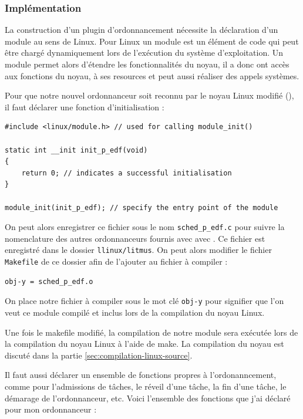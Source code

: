 \subsubsection{Implémentation}

La construction d'un plugin d'ordonnancement nécessite la déclaration d'un module au sens de Linux. Pour Linux un module est un élément de code qui peut être chargé dynamiquement lors de l’exécution du système d'exploitation. Un module permet alors d'étendre les fonctionnalités du noyau, il a donc ont accès aux fonctions du noyau, à ses resources et peut aussi réaliser des appels systèmes.

Pour que notre nouvel ordonnanceur soit reconnu par le noyau Linux modifié (\litmus), il faut déclarer une fonction d'initialisation :
\begin{lstlisting}[style=cstyle]
#include <linux/module.h> // used for calling module_init()

static int __init init_p_edf(void)
{
    return 0; // indicates a successful initialisation
}

module_init(init_p_edf); // specify the entry point of the module 
\end{lstlisting} 

On peut alors enregistrer ce fichier sous le nom \lstinline{sched_p_edf.c} pour suivre la nomenclature des autres ordonnanceurs fournis avec avec \litmus. Ce fichier est enregistré dans le dossier \lstinline{llinux/litmus}. On peut alors modifier le fichier \lstinline{Makefile} de ce dossier afin de l'ajouter au fichier à compiler :

\begin{lstlisting}[style=makefilestyle]  
    obj-y = sched_p_edf.o
\end{lstlisting}    

On place notre fichier à compiler sous le mot clé \texttt{obj-y} pour signifier que l'on veut ce module compilé et inclus lors de la compilation du noyau Linux.

Une fois le makefile modifié, la compilation de notre module sera exécutée lors de la compilation du noyau Linux à l'aide de make. La compilation du noyau est discuté dans la partie \ref{sec:compilation-linux-source}.

Il faut aussi déclarer un ensemble de fonctions propres à l'ordonanncement, comme pour l'admissions de tâches, le réveil d'une tâche, la fin d'une tâche, le démarage de l'ordonnanceur, etc. Voici l'ensemble des fonctions que j'ai déclaré pour mon ordonnanceur :

